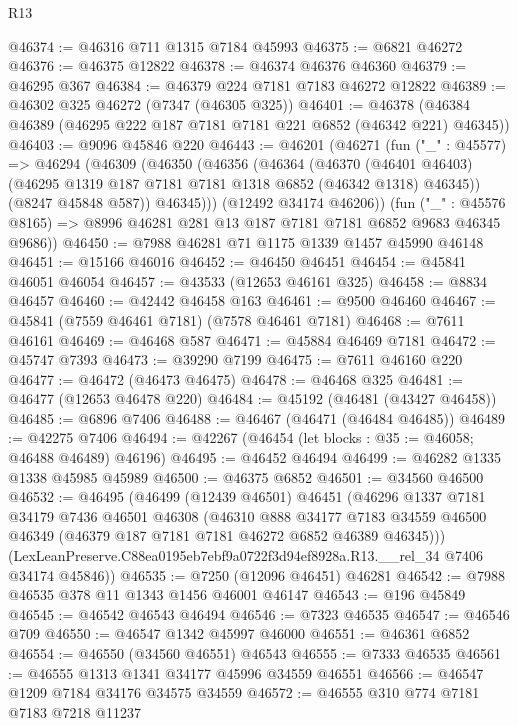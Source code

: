 \begin{lexlean}{R13}
\begin{coremodule}
@46374 := @46316 @711 @1315 @7184 @45993
@46375 := @6821 @46272
@46376 := @46375 @12822
@46378 := @46374 @46376 @46360
@46379 := @46295 @367
@46384 := @46379 @224 @7181 @7183 @46272 @12822
@46389 := @46302 @325 @46272 (@7347 (@46305 @325))
@46401 := @46378 (@46384 @46389 (@46295 @222 @187 @7181 @7181 @221 @6852 (@46342 @221) @46345))
@46403 := @9096 @45846 @220
@46443 := @46201
    (@46271
      (fun ("_" : @45577) =>
      @46294
        (@46309
          (@46350
            (@46356
              (@46364
                (@46370
                  (@46401 @46403)
                  (@46295 @1319 @187 @7181 @7181 @1318 @6852 (@46342 @1318) @46345))
                (@8247 @45848 @587))
              @46345)))
        (@12492 @34174 @46206))
      (fun ("_" : @45576 @8165) => @8996 @46281 @281 @13 @187 @7181 @7181 @6852 @9683 @46345 @9686))
@46450 := @7988 @46281 @71 @1175 @1339 @1457 @45990 @46148
@46451 := @15166 @46016
@46452 := @46450 @46451
@46454 := @45841 @46051 @46054
@46457 := @43533 (@12653 @46161 @325)
@46458 := @8834 @46457
@46460 := @42442 @46458 @163
@46461 := @9500 @46460
@46467 := @45841 (@7559 @46461 @7181) (@7578 @46461 @7181)
@46468 := @7611 @46161
@46469 := @46468 @587
@46471 := @45884 @46469 @7181
@46472 := @45747 @7393
@46473 := @39290 @7199
@46475 := @7611 @46160 @220
@46477 := @46472 (@46473 @46475)
@46478 := @46468 @325
@46481 := @46477 (@12653 @46478 @220)
@46484 := @45192 (@46481 (@43427 @46458))
@46485 := @6896 @7406
@46488 := @46467 (@46471 (@46484 @46485))
@46489 := @42275 @7406
@46494 := @42267 (@46454 (let blocks : @35 := @46058; @46488 @46489) @46196)
@46495 := @46452 @46494
@46499 := @46282 @1335 @1338 @45985 @45989
@46500 := @46375 @6852
@46501 := @34560 @46500
@46532 := @46495
    (@46499
      (@12439 @46501)
      @46451
      (@46296
        @1337
        @7181
        @34179
        @7436
        @46501
        @46308
        (@46310
          @888
          @34177
          @7183
          @34559
          @46500
          @46349
          (@46379 @187 @7181 @7181 @46272 @6852 @46389 @46345)))
      (LexLeanPreserve.C88ea0195eb7ebf9a0722f3d94ef8928a.R13.__rel_34 @7406 @34174 @45846))
@46535 := @7250 (@12096 @46451) @46281
@46542 := @7988 @46535 @378 @11 @1343 @1456 @46001 @46147
@46543 := @196 @45849
@46545 := @46542 @46543 @46494
@46546 := @7323 @46535
@46547 := @46546 @709
@46550 := @46547 @1342 @45997 @46000
@46551 := @46361 @6852
@46554 := @46550 (@34560 @46551) @46543
@46555 := @7333 @46535
@46561 := @46555 @1313 @1341 @34177 @45996 @34559 @46551
@46566 := @46547 @1209 @7184 @34176 @34575 @34559
@46572 := @46555 @310 @774 @7181 @7183 @7218 @11237

\end{coremodule}
\end{lexlean}
